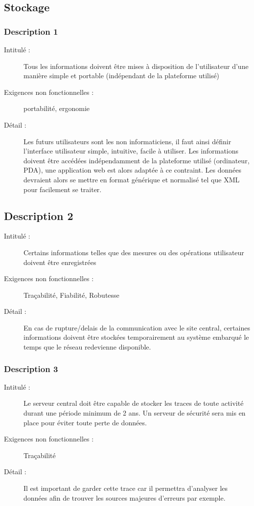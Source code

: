 \subsection {Stockage}
 \subsubsection {Description 1}
\begin{description}
           \item[Intitulé :] Tous les informations doivent être mises à disposition de l'utilisateur d'une manière simple et portable (indépendant de la plateforme utilisé)
           \item[Exigences non fonctionnelles :] portabilité,  ergonomie
           \item[Détail :] Les futurs utilisateurs sont les non informaticiens, il faut ainsi définir l’interface utilisateur simple, intuitive, facile à utiliser. Les informations doivent être accédées indépendamment de la plateforme utilisé (ordinateur, PDA), une application web est alors adaptée à ce contraint.  Les données devraient alors se mettre en format générique et normalisé tel que XML pour facilement se traiter.
\end{description}

\subsection {Description 2}
\begin{description}
           \item[Intitulé :] Certains informations telles que des mesures ou des opérations utilisateur doivent être enregistrées 
           \item[Exigences non fonctionnelles :] Traçabilité, Fiabilité, Robutesse
           \item[Détail :] En cas de rupture/delais de la communication avec le site central, certaines informations doivent être stockées temporairement au système embarqué  le temps que le 
réseau redevienne disponible.
\end{description}

\subsubsection {Description 3}
\begin{description}
           \item[Intitulé :] Le serveur central doit être capable de stocker les traces de toute activité durant une période minimum de 2 ans. Un serveur de sécurité sera mis en place pour éviter toute perte de données. 
           \item[Exigences non fonctionnelles :] Traçabilité
           \item[Détail :] Il est important de garder cette trace car il permettra d’analyser les données afin de trouver les sources majeures d’erreurs par exemple. 
\end{description}

